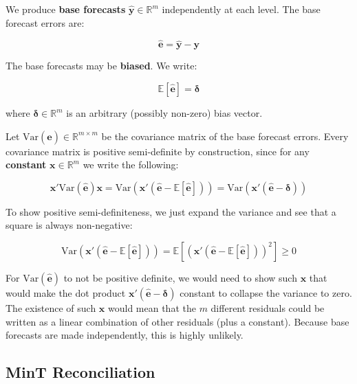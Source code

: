 \documentclass[sn-basic,Numbered,iicol]{sn-jnl}
\theoremstyle{thmstyleone}%
\theoremstyle{thmstyletwo}%
\theoremstyle{thmstylethree}%
\begin{document}
We produce \textbf{base forecasts} $\hat{\mathbf{y}} \in \mathbb{R}^m$ independently at each level. The base forecast errors are:

\begin{equation}
\hat{\mathbf{e}} = \hat{\mathbf{y}} - \mathbf{y}
\end{equation}

The base forecasts may be \textbf{biased}. We write:

\begin{equation}
\mathbb{E}[\hat{\mathbf{e}}] = \boldsymbol{\delta}
\end{equation}

where $\boldsymbol{\delta} \in \mathbb{R}^m$ is an arbitrary (possibly non-zero) bias vector.

Let $\text{Var}(\hat{\mathbf{e}}) \in \mathbb{R}^{m \times m}$ be the covariance matrix of the base forecast errors. Every covariance matrix is positive semi-definite by construction, since for any \textbf{constant} $\mathbf{x} \in \mathbb{R}^m$ we write the following:

\begin{equation}
\mathbf{x}' \text{Var}(\hat{\mathbf{e}}) \mathbf{x} = \text{Var}(\mathbf{x}'(\hat{\mathbf{e}} - \mathbb{E}[\hat{\mathbf{e}}])) = \text{Var}(\mathbf{x}'(\hat{\mathbf{e}} - \boldsymbol{\delta}))
\end{equation}

To show positive semi-definiteness, we just expand the variance and see that a square is always non-negative:

\begin{equation}
\text{Var}(\mathbf{x}'(\hat{\mathbf{e}} - \mathbb{E}[\hat{\mathbf{e}}])) = \mathbb{E}\left[(\mathbf{x}'(\hat{\mathbf{e}} - \mathbb{E}[\hat{\mathbf{e}}]))^2\right] \geq 0
\end{equation}

For $\text{Var}(\hat{\mathbf{e}})$ to not be positive definite, we would need to show such $\mathbf{x}$ that would make the dot product $\mathbf{x}'(\hat{\mathbf{e}} - \boldsymbol{\delta})$ constant to collapse the variance to zero. The existence of such $\mathbf{x}$ would mean that the $m$ different residuals could be written as a linear combination of other residuals (plus a constant). Because base forecasts are made independently, this is highly unlikely.

\subsection{MinT Reconciliation}\label{subsec:mint}
\end{document}
